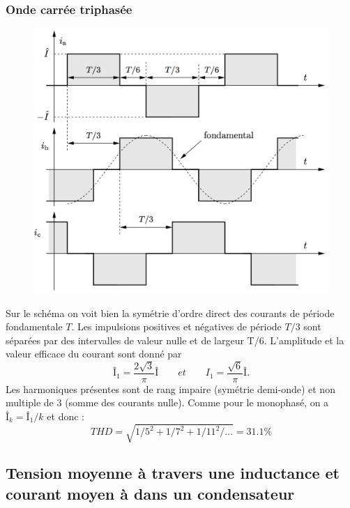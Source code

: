 		\subsubsection{Onde carrée triphasée}
			\begin{figure}
			\vspace{-5mm}
			\includegraphics[scale=0.20]{ch1/8}
			\end{figure}		
			Sur le schéma on voit bien la symétrie d'ordre direct des courants de période fondamentale $T$. Les impulsions positives et négatives de période $T/3$ sont séparées par des intervalles de valeur nulle et de largeur T/6. L'amplitude et la valeur efficace du courant sont donné par 
			\begin{equation}
				Î_{1} = \frac{2\sqrt{3}}{\pi} Î \qquad et \qquad I_1 = \frac{\sqrt{6}}{\pi} Î.
			\end{equation}
			Les harmoniques présentes sont de rang impaire (symétrie demi-onde) et non multiple de 3 (somme des courants nulle). Comme pour le monophasé, on a $Î _k = Î_1/k$ et donc :
			\begin{equation}
				THD = \sqrt{1/5^2 + 1/7^2 + 1/11^2 / \dots} = 31.1\%
			\end{equation}
			
	\subsection{Tension moyenne à travers une inductance et courant moyen à dans un condensateur}
